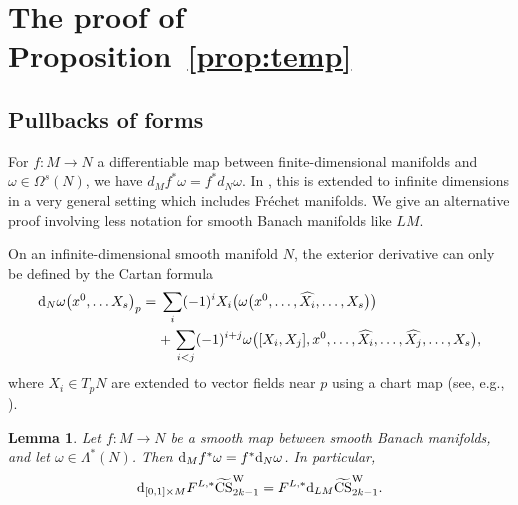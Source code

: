\documentclass[10pt,a4paper]{amsart}
\numberwithin{equation}{section}
\newtheorem{Lemma}[Theorem]{Lemma}
\theoremstyle{definition}
\newcommand{\kk}{2k-1 }
\newcommand{\bm}{ M}
\newcommand{\ocs}{\widetilde{{\rm CS}}}
\newcommand{\itbm}{[0,1]\times M}
\begin{document}
\section{The proof of Proposition~\ref{prop:temp}}\label{app:oldB}

\subsection{Pullbacks of forms}%

 For $f\colon M\to N$ a differentiable map between finite-dimensional manifolds and $\omega\in \Omega^s(N)$, we have $ d_{M}f^*\omega = f^* d_N \omega$.
In \cite[Section~33.15]{KM}, this is
 extended to infinite dimensions in a very general setting which includes Fr\'echet manifolds.
 We give an alternative proof involving less notation for smooth Banach manifolds like $LM$.

 On an infinite-dimensional smooth manifold $N$, the exterior derivative can only be defined by the Cartan formula
\begin{align*} {\rm d}_N\omega\bigl(x^0,\dots X_{s}\bigr)_p={}& \sum_i (-1)^i X_i \bigl( \omega\bigl(x^0,\dots,\widehat{X_i},\dots, X_{s}\bigr)\bigr)\\
&{}{+}\, \sum_{i<j} (-1)^{i+j}\omega\bigl([X_i,X_j], x^0,\dots, \widehat{X_i},\dots, \widehat{X_j},\dots,X_{s}\bigr),
\end{align*}
where $X_i\in T_pN$ are extended to vector fields near $p$ using a chart map (see, e.g., \cite[Section~33.12]{KM}).
\begin{Lemma} \label{lem:2.1} Let $f\colon M\to N$ be a smooth map between smooth Banach manifolds, and let $\omega\in \Lambda^*(N)$.
Then $ {\rm d}_Mf^*\omega = f^* {\rm d}_N \omega$. In particular,
\[
{\rm d}_{\itbm}F^{L,*}\ocs^{\rm W}_{\kk} = F^{L,*} {\rm d}_{L\bm} \ocs^{\rm W}_{\kk}.
\]
\end{Lemma}
\end{document}
